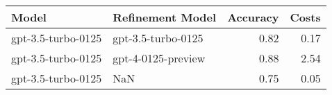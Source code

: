 \begin{tabular}{llrr}
\toprule
Model & Refinement Model & Accuracy & Costs \\
\midrule
gpt-3.5-turbo-0125 & gpt-3.5-turbo-0125 & 0.82 & 0.17 \\
gpt-3.5-turbo-0125 & gpt-4-0125-preview & 0.88 & 2.54 \\
gpt-3.5-turbo-0125 & NaN & 0.75 & 0.05 \\
\bottomrule
\end{tabular}
